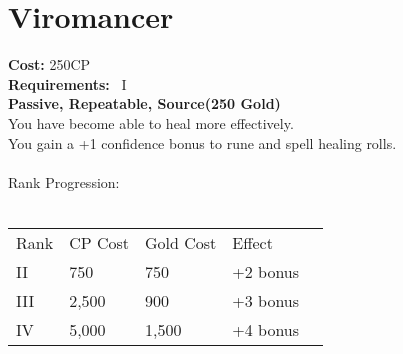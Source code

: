 \section{Viromancer}\label{perk:viromancer}
\textbf{Cost:} 250CP\\
\textbf{Requirements:}~ I\\
\textbf{Passive, Repeatable, Source(250 Gold)}\\
You have become able to heal more effectively.\\
You gain a +1 confidence bonus to rune and spell healing rolls.\\
\\
Rank Progression:\\
\\
\begin{tabular}{l | l | l | l | l}
    Rank & CP Cost & Gold Cost &  Effect\\
    II & 750 & 750 & +2 bonus\\
    III & 2,500 & 900 & +3 bonus\\
    IV & 5,000 & 1,500 & +4 bonus\\
\end{tabular}